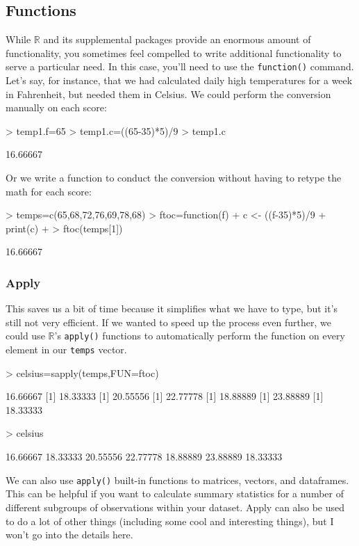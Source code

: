 \documentclass[12pt]{article}
\begin{document}
\subsection{Functions}
While $\mathbb{R}$ and its supplemental packages provide an enormous amount of functionality, you sometimes feel compelled to write additional functionality to serve a particular need. In this case, you'll need to use the \verb|function()| command. Let's say, for instance, that we had calculated daily high temperatures for a week in Fahrenheit, but needed them in Celsius. We could perform the conversion manually on each score:
\begin{Schunk}
\begin{Sinput}
> temp1.f=65
> temp1.c=((65-35)*5)/9
> temp1.c
\end{Sinput}
\begin{Soutput}
[1] 16.66667
\end{Soutput}
\end{Schunk}

Or we write a function to conduct the conversion without having to retype the math for each score:
\begin{Schunk}
\begin{Sinput}
> temps=c(65,68,72,76,69,78,68)
> ftoc=function(f) {
+ 	c <- ((f-35)*5)/9
+ 	print(c)
+ }
> ftoc(temps[1])
\end{Sinput}
\begin{Soutput}
[1] 16.66667
\end{Soutput}
\end{Schunk}

\subsubsection{Apply}
This saves us a bit of time because it simplifies what we have to type, but it's still not very efficient. If we wanted to speed up the process even further, we could use $\mathbb{R}$'s \verb|apply()| functions to automatically perform the function on every element in our \verb|temps| vector.
\begin{Schunk}
\begin{Sinput}
> celsius=sapply(temps,FUN=ftoc)
\end{Sinput}
\begin{Soutput}
[1] 16.66667
[1] 18.33333
[1] 20.55556
[1] 22.77778
[1] 18.88889
[1] 23.88889
[1] 18.33333
\end{Soutput}
\begin{Sinput}
> celsius
\end{Sinput}
\begin{Soutput}
[1] 16.66667 18.33333 20.55556 22.77778 18.88889 23.88889 18.33333
\end{Soutput}
\end{Schunk}
We can also use \verb|apply()| built-in functions to matrices, vectors, and dataframes. This can be helpful if you want to calculate summary statistics for a number of different subgroups of observations within your dataset. Apply can also be used to do a lot of other things (including some cool and interesting things), but I won't go into the details here.
\end{document}
